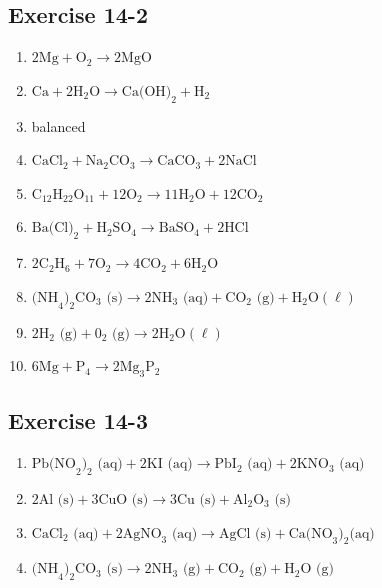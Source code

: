 \subsection{Exercise 14-2}
\begin{multicols}{2}
 \begin{enumerate}[noitemsep, label=\textbf{(\arabic*)} ]
  \item $2\text{Mg} + \text{O}_{2} \to 2\text{MgO}$
\item ${\text{Ca}}+2{\text{H}}_{2}\text{O} \to \text{Ca(OH)}_{2} + \text{H}_{2}$
\item balanced
\item $\text{CaCl}_{2} + {\text{Na}}_{2}{\text{CO}}_{3} \to \text{CaCO}_{3} + 2{\text{NaCl}}$
\item ${\text{C}}_{12}{\text{H}}_{22}{\text{O}}_{11} + 12\text{O}_{2} \to 11\text{H}_{2}\text{O} + 12\text{CO}_{2}$
\item $\text{Ba(Cl)}_{2} + \text{H}_{2}\text{SO}_{4} \to \text{BaSO}_{4} + 2\text{HCl}$
\item $2\text{C}_{2}\text{H}_{6} + 7\text{O}_{2} \to 4\text{CO}_{2} + 6\text{H}_{2}\text{O}$
\item $\text{(NH}_{4}\text{)}_{2}\text{CO}_{3}\text{ (s)} \to 2\text{NH}_{3} \text{ (aq)} + \text{CO}_{2} \text{ (g)} + \text{H}_{2}\text{O} (\ell)$
\item $2\text{H}_{2}\text{ (g)} + \text{0}_{2}\text{ (g)} \to 2\text{H}_{2}\text{O}(\ell)$
\item $6\text{Mg} + \text{P}_{4} \to 2\text{Mg}_{3}\text{P}_{2}$
 \end{enumerate}
\end{multicols}

\subsection{Exercise 14-3}
\begin{multicols}{2}
 \begin{enumerate}[noitemsep, label=\textbf{(\arabic*)} ]
\item $\text{Pb(NO}_{2}\text{)}_{2}\text{ (aq)} + 2\text{KI} \text{ (aq)} \to \text{PbI}_{2} \text{ (aq)} + 2\text{KNO}_{3}\text{ (aq)}$
\item $2\text{Al}\text{ (s)} + 3\text{CuO}\text{ (s)} \to 3\text{Cu (s)} + \text{Al}_{2}\text{O}_{3} \text{ (s)}$
\item $\text{CaCl}_{2}\text{ (aq)} + 2\text{AgNO}_{3} \text{ (aq)} \to \text{AgCl} \text{ (s)} + \text{Ca(NO}_{3}\text{)}_{2} \text{(aq)}$
\item $\text{(NH}_{4}\text{)}_{2}\text{CO}_{3}\text{ (s)} \to 2\text{NH}_{3}\text{ (g)} + \text{CO}_{2}\text{ (g)} + \text{H}_{2}\text{O}\text{ (g)}$
 \end{enumerate}
\end{multicols}

